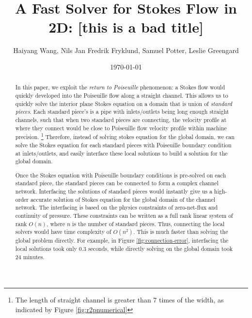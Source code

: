 \documentclass[10pt,twocolumn]{article}
\author{Haiyang Wang, Nils Jan Fredrik Fryklund, Samuel Potter, Leslie Greengard}
\date{\today}
\title{A Fast Solver for Stokes Flow in 2D: [this is a bad title]}
\begin{document}
\maketitle

\begin{abstract}
  In this paper, we exploit the \textit{return to Poiseuille} phenomenon: 
  a Stokes flow would quickly developed into the Poiseuille flow along a straight channel. 
  This allows us to quickly solve the interior plane Stokes equation 
  on a domain that is union of \textit{standard pieces}. 
  Each standard piece's is a pipe with inlets/outlets 
  being long enough straight channels, such that when two standard pieces are connecting, 
  the velocity profile at where they connect would be close to Poiseuille flow velocity profile 
  within machine precision. 
  \footnote{The length of straight channel is greater than 7 times of the width, 
  as indicated by Figure \ref{fig:r2pnumerical} }
  Therefore, instead of solving stokes equation for the global domain, 
  we can solve the Stokes equation 
  for each standard pieces with Poiseuille 
  boundary condition at inlets/outlets, 
  and easily interface these local solutions 
  to build a solution for the global domain. 
  
  Once the Stokes equation with Poiseuille boundary conditions is pre-solved on each standard piece, 
  the standard pieces can be connected to form a complex channel network. 
  Interfacing the solutions of standard pieces
  would instantly give us a high-order accurate solution of Stokes equation 
  for the global domain of the channel network. 
  The interfacing is based on 
  the physics constraints of  zero-net-flux and continuity of pressure. 
  These constraints can be written as a full rank linear system of rank $O(n)$,
  where $n$ is the number of standard pieces. Thus, connecting the local solvers 
  would have time complexity of $O(n^2)$. 
  This is much faster than solving the global problem directly. 
  For example, in Figure \ref{fig:connection-error}, interfacing the local solutions took only 0.3 seconds, while directly
  solving on the global domain took 24 minutes. 
\end{abstract}
\end{document}
